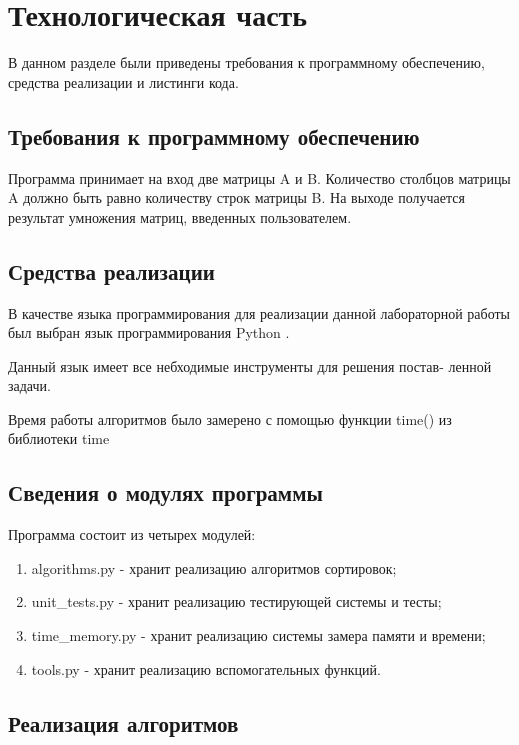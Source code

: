\chapter{Технологическая часть}

В данном разделе были приведены требования к программному обеспечению, средства реализации и листинги кода.

\section{Требования к программному обеспечению}

Программа принимает на вход две матрицы A и B. Количество столбцов матрицы A должно быть равно количеству строк матрицы B. На выходе получается результат умножения матриц, введенных пользователем.


\section{Средства реализации}

В качестве языка программирования для реализации данной лабораторной работы был выбран язык программирования Python \cite{pythonlang}. 

Данный язык имеет все небходимые инструменты для решения постав-
ленной задачи.

Время работы алгоритмов было замерено с помощью функции time() из библиотеки time \cite{pythonlangtime}

\section{Сведения о модулях программы}
Программа состоит из четырех модулей:
\begin{enumerate}
	\item algorithms.py - хранит реализацию алгоритмов сортировок;
	\item unit\_tests.py - хранит реализацию тестирующей системы и тесты;
	\item time\_memory.py - хранит реализацию системы замера памяти и времени;
	\item tools.py - хранит реализацию вспомогательных функций.
\end{enumerate}


\section{Реализация алгоритмов}

